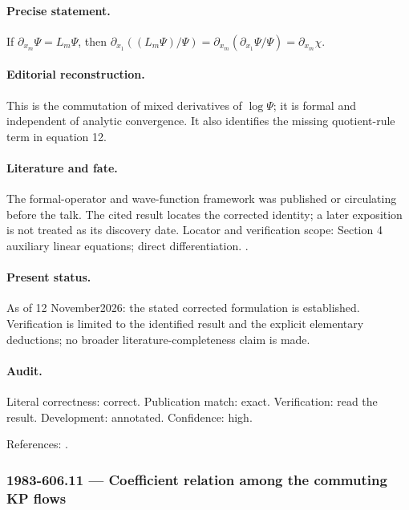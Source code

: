 \paragraph{Precise statement.} If \(\partial_{x_m}\Psi=L_m\Psi\), then \(\partial_{x_1}((L_m\Psi)/\Psi)=\partial_{x_m}(\partial_{x_1}\Psi/\Psi)=\partial_{x_m}\chi\).

\paragraph{Editorial reconstruction.} This is the commutation of mixed derivatives of \(\log\Psi\); it is formal and independent of analytic convergence. It also identifies the missing quotient-rule term in equation 12.

\paragraph{Literature and fate.} The formal-operator and wave-function framework was published or circulating before the talk. The cited result locates the corrected identity; a later exposition is not treated as its discovery date. Locator and verification scope: Section 4 auxiliary linear equations; direct differentiation. \cite{segalwilson1985loop}.

\paragraph{Present status.} As of 12 November2026: the stated corrected formulation is established. Verification is limited to the identified result and the explicit elementary deductions; no broader literature-completeness claim is made.

\paragraph{Audit.} Literal correctness: correct. Publication match: exact. Verification: read the result. Development: annotated. Confidence: high.

\noindent References: \citep{segalwilson1985loop}.\par

\subsubsection{1983-606.11 --- Coefficient relation among the commuting KP flows}

\label{item:1983-606.11}

